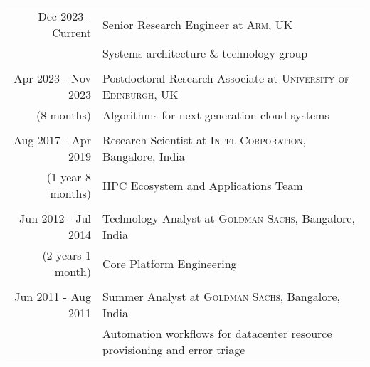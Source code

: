 \documentclass[a4paper,10pt]{article} %
\begin{document}
\begin{tabular}{r|p{10cm}}
Dec 2023 - Current & Senior Research Engineer at \textsc{Arm}, UK \\
& \footnotesize{Systems architecture \& technology group}\\
&\\
Apr 2023 - Nov 2023 & Postdoctoral Research Associate at \textsc{University of Edinburgh}, UK \\
{\footnotesize(8 months)} & \footnotesize{Algorithms for next generation cloud systems}\\
&\\
Aug 2017 - Apr 2019 & Research Scientist at \textsc{Intel Corporation}, Bangalore, India \\
{\footnotesize(1 year 8 months)} & \footnotesize{HPC Ecosystem and Applications Team}\\
&\\

Jun 2012 - Jul 2014 & Technology Analyst at \textsc{Goldman Sachs}, Bangalore, India \\
{\footnotesize (2 years 1 month)} & \footnotesize{Core Platform Engineering}\\ 
& \\



Jun 2011 - Aug 2011 & Summer Analyst at \textsc{Goldman Sachs}, Bangalore, India \\
& \footnotesize{Automation workflows for datacenter resource provisioning and error triage}\\



\end{tabular}
\end{document}
